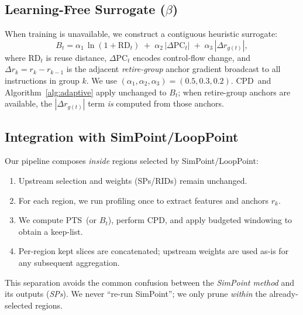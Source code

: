 \documentclass[10pt,journal,compsoc]{IEEEtran}
\newcommand{\pts}{\textsc{PTS}}
\newcommand{\cpd}{\textsc{CPD}}
\begin{document}
\subsection{Learning-Free Surrogate (\texorpdfstring{$\beta$}{beta})}
\label{subsec:beta}
When training is unavailable, we construct a contiguous heuristic surrogate:
\begin{equation}
B_t=\alpha_1\,\ln(1+\mathrm{RD}_t)\;+\;\alpha_2\,|\Delta\mathrm{PC}_t|\;+\;\alpha_3\,|\Delta r_{g(t)}|,
\end{equation}
where \(\mathrm{RD}_t\) is reuse distance, \(\Delta \mathrm{PC}_t\) encodes control-flow change, and \(\Delta r_k=r_k-r_{k-1}\) is the adjacent \emph{retire-group} anchor gradient broadcast to all instructions in group \(k\). We use \((\alpha_1,\alpha_2,\alpha_3)=(0.5,0.3,0.2)\). \cpd\ and Algorithm~\ref{alg:adaptive} apply unchanged to \(B_t\); when retire-group anchors are available, the \(|\Delta r_{g(t)}|\) term \emph{is} computed from those anchors.
\subsection{Integration with SimPoint/LoopPoint}
Our pipeline composes \emph{inside} regions selected by SimPoint/LoopPoint:
\begin{enumerate}[leftmargin=*,nosep]
  \item Upstream selection and weights (SPs/RIDs) remain unchanged.
  \item For each region, we run profiling once to extract features and anchors \(r_k\).
  \item We compute \pts\ (or \(B_t\)), perform \cpd, and apply budgeted windowing to obtain a keep-list.
  \item Per-region kept slices are concatenated; upstream weights are used as-is for any subsequent aggregation.
\end{enumerate}
This separation avoids the common confusion between the \emph{SimPoint method} and its outputs (\emph{SPs}). We never “re-run SimPoint”; we only prune \emph{within} the already-selected regions.
\end{document}
